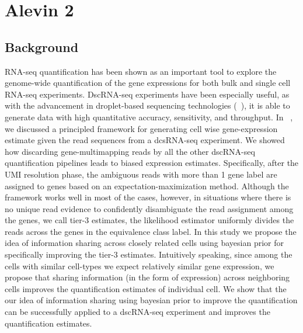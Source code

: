 
\chapter{Alevin 2} %

\label{alevin2} %


\section{Background}

RNA-seq quantification has been shown as an important tool to explore the genome-wide
quantification of the gene expressions for both bulk and single cell RNA-seq experiments.
DscRNA-seq experiments have been especially useful, as with the advancement in droplet-based 
sequencing technologies (~\citep{dropseq, indrop, tenx}), it is able to generate data with high 
quantitative accuracy, sensitivity, and throughput. In ~, we discussed a 
principled framework for generating cell wise gene-expression estimate given the read sequences
from a dcsRNA-seq experiment. We showed how discarding gene-multimapping reads by all the other dscRNA-seq quantification pipelines leads to biased expression estimates. 
Specifically, after the UMI resolution phase, the ambiguous reads with more than 1 gene label are assigned to
genes based on an expectation-maximization method. Although the framework works well in most of the cases,
however, in situations where there is no unique read evidence to confidently disambiguate the read assignment
among the genes, we call tier-3 estimates, the likelihood estimator uniformly divides the reads across the genes in the equivalence class label. In this study we propose the idea of information sharing across closely 
related cells using bayesian prior for specifically improving the tier-3 estimates. Intuitively speaking, 
since among the cells with similar cell-types we expect relatively similar gene expression, we propose that 
sharing information (in the form of expression) across neighboring cells improves the quantification 
estimates of individual cell. We show that the our idea of information sharing using bayesian 
prior to improve the quantification can be successfully applied to a dscRNA-seq experiment and improves the 
quantification estimates.

